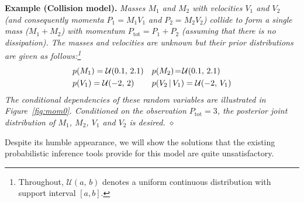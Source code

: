 {\bf Example (Collision model). }
\emph{Masses $M_1$ and $M_2$ with velocities $V_1$ and $V_2$ (and consequently momenta $P_1 = M_1 V_1$ and $P_2 = M_2 V_2$) collide to form a single mass ($M_1 + M_2$) with momentum $P_\text{tot} = P_1 + P_2$ (assuming that there is no dissipation).
The masses and velocities are unknown but 
their prior distributions are given as follows:\footnote{
Throughout, $\mathcal{U}(a, \, b)$ denotes a uniform continuous distribution 
with support interval $[a, b]$.
} 
}%
{\footnotesize \vspace{-0.5mm}
\begin{align}
&p(M_1) = \mathcal{U}(0.1, \, 2.1) 
&&p(M_2) \!=\! \mathcal{U}(0.1, \, 2.1)
\nonumber
\\
&p(V_1) = \mathcal{U}(-2, \, 2)
&&p(V_2 \, | \, V_1) = \mathcal{U}(-2, \, V_1)
\label{e:collision}
\end{align} 
}
\emph{
\!\!\!The conditional dependencies of these random variables are illustrated in 
Figure~\ref{fig:mom0}. %
Conditioned on the observation $P_{\text{tot}} = 3$, the posterior joint distribution of $M_1$, $M_2$, $V_1$ and $V_2$ is desired. 
\hspace*{\fill} $\diamond$} %

Despite its humble appearance, we will show the solutions that the existing probabilistic inference tools provide for this model are quite unsatisfactory. 


